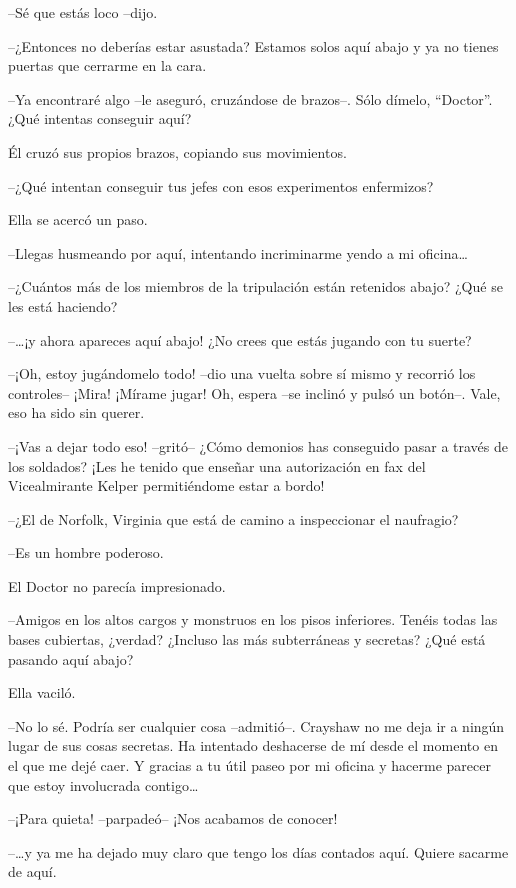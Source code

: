 {--Sé que estás loco --dijo.}

{--¿Entonces no deberías estar asustada? Estamos solos aquí abajo y ya
no tienes puertas que cerrarme en la cara.}

{--Ya encontraré algo --le aseguró, cruzándose de brazos--. Sólo dímelo,
``Doctor''. ¿Qué intentas conseguir aquí?}

{Él cruzó sus propios brazos, copiando sus movimientos.}

{--¿Qué intentan conseguir tus jefes con esos experimentos enfermizos?}

{Ella se acercó un paso.}

{--Llegas husmeando por aquí, intentando incriminarme yendo a mi
 oficina\ldots{}}

{--¿Cuántos más de los miembros de la tripulación están retenidos abajo?
¿Qué se les está haciendo?}

{--\ldots{}¡y ahora apareces aquí abajo! ¿No crees que estás jugando con
tu suerte?}

{--¡Oh, estoy jugándomelo todo! --dio una vuelta sobre sí mismo y
 recorrió los controles-- ¡Mira! ¡Mírame jugar! Oh, espera --se inclinó y
pulsó un botón--. Vale, eso ha sido sin querer.}

{--¡Vas a dejar todo eso! --gritó-- ¿Cómo demonios has conseguido pasar
 a través de los soldados? ¡Les he tenido que enseñar una autorización en
fax del Vicealmirante Kelper permitiéndome estar a bordo!}

{--¿El de Norfolk, Virginia que está de camino a inspeccionar el
naufragio?}

{--Es un hombre poderoso.}

{El Doctor no parecía impresionado.}

{--Amigos en los altos cargos y monstruos en los pisos inferiores.
 Tenéis todas las bases cubiertas, ¿verdad? ¿Incluso las más subterráneas
y secretas? ¿Qué está pasando aquí abajo?}

{Ella vaciló.}

{--No lo sé. Podría ser cualquier cosa --admitió--. Crayshaw no me deja
 ir a ningún lugar de sus cosas secretas. Ha intentado deshacerse de mí
 desde el momento en el que me dejé caer. Y gracias a tu útil paseo por
 mi oficina y hacerme parecer que estoy involucrada contigo\ldots{}}

{--¡Para quieta! --parpadeó-- ¡Nos acabamos de conocer!}

{--\ldots{}y ya me ha dejado muy claro que tengo los días contados aquí.
Quiere sacarme de aquí.}

